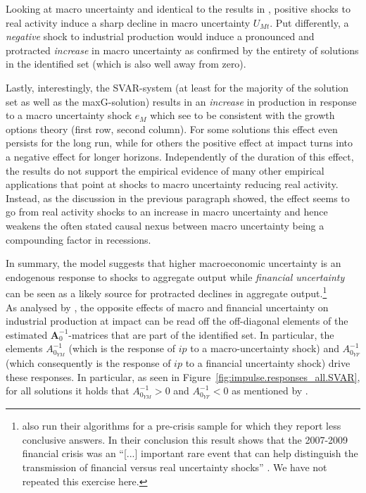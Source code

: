\documentclass[a4paper,11pt,listof=nochaptergap,oneside,pointednumbers,bibtotoc,bigheadings,liststotoc,hidelinks]{scrbook}
\theoremstyle{mysatz}
\theoremstyle{mydefinition}
\theoremstyle{mytheorem}
\theoremstyle{mybemerkung}
\newcommand{\vect}[1]{\boldsymbol{\mathbf{#1}}}
\begin{document}
Looking at macro uncertainty and identical to the results in \citet{ludvigsonetal:19}, positive shocks to real activity induce a sharp decline in macro uncertainty $U_{Mt}$. Put differently, a \textit{negative} shock to industrial production would induce a pronounced and protracted \textit{increase} in macro uncertainty as confirmed by the entirety of solutions in the identified set (which is also well away from zero). 

Lastly, interestingly, the SVAR-system (at least for the majority of the solution set as well as the maxG-solution) results in an \textit{increase} in production in response to a macro uncertainty shock $e_{M}$ which \citet{ludvigsonetal:19} see to be consistent with the growth options theory (first row, second column). For some solutions this effect even persists for the long run, while for others the positive effect at impact turns into a negative effect for longer horizons. Independently of the duration of this effect, the results do not support the empirical evidence of many other empirical applications that point at shocks to macro uncertainty reducing real activity. Instead, as the discussion in the previous paragraph showed, the effect seems to go from real activity shocks to an increase in macro uncertainty and hence weakens the often stated causal nexus between macro uncertainty being a compounding factor in recessions. 

In summary, the model suggests that higher macroeconomic uncertainty is an endogenous response to shocks to aggregate output while \textit{financial uncertainty} can be seen as a likely source for protracted declines in aggregate output.\footnote{\citet{ludvigsonetal:18} also run their algorithms for a pre-crisis sample for which they report less conclusive answers. In their conclusion this result shows that the 2007-2009 financial crisis was an ``[...] important rare event that can help distinguish the transmission of financial versus real uncertainty shocks'' \citet[p. 25]{ludvigsonetal:18}. We have not repeated this exercise here.}\\


As analysed by \citet{ludvigsonetal:19}, the opposite effects of macro and financial uncertainty on industrial production at impact can be read off the off-diagonal elements of the estimated $\vect{A}_0^{-1}$-matrices that are part of the identified set. In particular, the elements $A_{0_{YM}}^{-1}$ (which is the response of $ip$ to a macro-uncertainty shock) and $A_{0_{YF}}^{-1}$ (which consequently is the response of $ip$ to a financial uncertainty shock) drive these responses. In particular, as seen in Figure~\ref{fig:impulse.responses_all.SVAR}, for all solutions it holds that $A_{0_{YM}}^{-1} > 0$ and $A_{0_{YF}}^{-1} < 0$ as mentioned by \citet{ludvigsonetal:19}.\\
\end{document}
